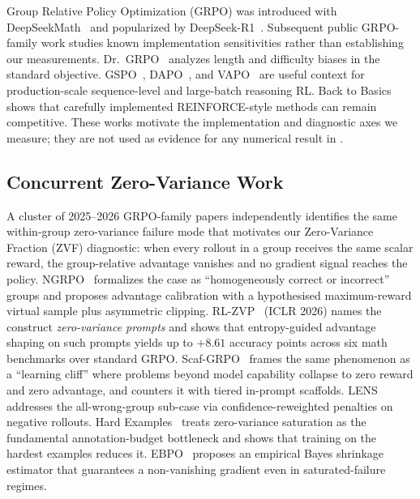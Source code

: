 Group Relative Policy Optimization (GRPO) was introduced with
DeepSeekMath~\cite{shao2024deepseekmath} and popularized by
DeepSeek-R1~\cite{guo2025deepseekr1, guo2025deepseekr1nature}. Subsequent
public GRPO-family work studies known implementation sensitivities rather than
establishing our measurements. Dr.~GRPO~\cite{tong2025drgrpo} analyzes length
and difficulty biases in the standard objective. GSPO~\cite{qwen2025gspo},
DAPO~\cite{yu2025dapo}, and VAPO~\cite{bytedance2025vapo} are useful context
for production-scale sequence-level and large-batch reasoning RL. Back to
Basics~\cite{ahmadian2024backtobasics} shows that carefully implemented
REINFORCE-style methods can remain competitive. These works motivate the
implementation and diagnostic axes we measure; they are not used as evidence
for any numerical result in \ours{}.

\subsection{Concurrent Zero-Variance Work}
\label{sec:related:concurrent-zv}

A cluster of 2025--2026 GRPO-family papers independently identifies the same
within-group zero-variance failure mode that motivates our Zero-Variance
Fraction (ZVF) diagnostic: when every rollout in a group receives the same
scalar reward, the group-relative advantage vanishes and no gradient signal
reaches the policy. NGRPO~\cite{nan2025ngrpo} formalizes the case as
``homogeneously correct or incorrect'' groups and proposes advantage
calibration with a hypothesised maximum-reward virtual sample plus asymmetric
clipping. RL-ZVP~\cite{le2025rlzvp} (ICLR 2026) names the construct
\emph{zero-variance prompts} and shows that entropy-guided advantage shaping
on such prompts yields up to $+8.61$ accuracy points across six math
benchmarks over standard GRPO. Scaf-GRPO~\cite{zhang2025scaffgrpo} frames the
same phenomenon as a ``learning cliff'' where problems beyond model capability
collapse to zero reward and zero advantage, and counters it with tiered
in-prompt scaffolds. LENS~\cite{feng2025lens} addresses the all-wrong-group
sub-case via confidence-reweighted penalties on negative rollouts. Hard
Examples~\cite{pikus2025hardexamples} treats zero-variance saturation as the
fundamental annotation-budget bottleneck and shows that training on the
hardest examples reduces it. EBPO~\cite{han2026ebpo} proposes an empirical
Bayes shrinkage estimator that guarantees a non-vanishing gradient even in
saturated-failure regimes.

